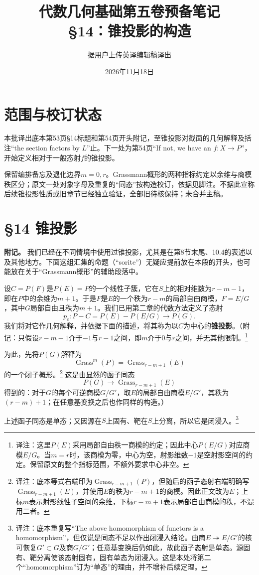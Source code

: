\documentclass[openany,fontset=fandol]{ctexbook}
\newcommand{\note}[1]{\footnote{译注：#1}}
\begin{document}
\title{代数几何基础第五卷预备笔记\\§14：锥投影的构造}
\author{据用户上传英译编辑稿译出}
\date{2026年11月18日}
\maketitle
\chapter*{范围与校订状态}
本批译出底本第53页§14标题和第54页开头附记，至锥投影对截面的几何解释及括注“the section factors by $L$”止。下一处为第54页“If not, we have an $f:X\to P$”，开始定义相对于一般态射$f$的锥投影。

保留编排备忘及退化边界$m=0,r$。Grassmann概形的两种指标约定以余维与商模秩区分；原文一处对象字母及重复的“同态”按构造校订，依据见脚注。不据此宣称后续锥投影性质或旧章节已经独立验证，全部旧待核保持；未合并主稿。
\chapter*{§14 锥投影}
\noindent\textbf{附记。}
我们已经在不同情境中使用过锥投影，尤其是在第8节末尾、10.4的表述以及其他地方。下面这组汇集的命题（“sorite”）无疑应提前放在本段的开头，也可能放在关于“Grassmann概形”的辅助段落中。

设$C=P(F)$是$P(E)=P$的一个线性子簇，它在$S$上的相对维数为$r-m-1$，即在$P$中的余维为$m+1$。于是$F$是$E$的一个秩为$r-m$的局部自由商模，$F=E/G$，其中$G$局部自由且秩为$m+1$。我们已用第二章的代数方法定义了态射
\[
p_c:P-C=P(E)-P(E/G)\longrightarrow P(G).
\]
我们将对它作几何解释，并依据下面的描述，将其称为以$C$为中心的\textbf{锥投影}。（附记：只假设$r-m-1$介于$-1$与$r-1$之间，即$m$介于$0$与$r$之间，并无其他限制。\note{这里$P(E)$采用局部自由秩一商模的约定；因此中心$P(E/G)$对应商模$E/G$。当$m=r$时，该商模为零，中心为空，射影维数$-1$是空射影空间的约定。保留原文的整个指标范围，不额外要求中心非空。}

为此，先将$P(G)$解释为
\[
\operatorname{Grass}^{m}(P)=\operatorname{Grass}_{r-m+1}(E)
\]
的一个闭子概形。\note{底本等式右端印为$\operatorname{Grass}_{r-m+1}(P)$，但随后的函子态射右端明确写$\operatorname{Grass}_{r-m+1}(E)$，并使用$E$的秩为$r-m+1$的商模。因此正文改为$E$；上标$m$表示射影线性子空间的余维，下标$r-m+1$表示局部自由商模的秩，不混用二者。}
这是由显然的函子同态
\[
P(G)\longrightarrow\operatorname{Grass}_{r-m+1}(E)
\]
得到的：对于$G$的每个可逆商模$G/G'$，取$E$的局部自由商模$E/G'$，其秩为$(r-m)+1$；在任意基变换之后也作同样的构造。）

上述函子同态是单态；又因源在$S$上固有、靶在$S$上分离，所以它是闭浸入。\note{底本重复写“The above homomorphism of functors is a homomorphism”，但仅说是同态不足以作出闭浸入结论。由商$E\twoheadrightarrow E/G'$的核可恢复$G'\subset G$及商$G/G'$；任意基变换后仍如此，故此函子态射是单态。源固有、靶分离使该态射固有，固有单态为闭浸入。这是本处将第二个“homomorphism”订为“单态”的理由，并不增补后续定理。}
\end{document}
